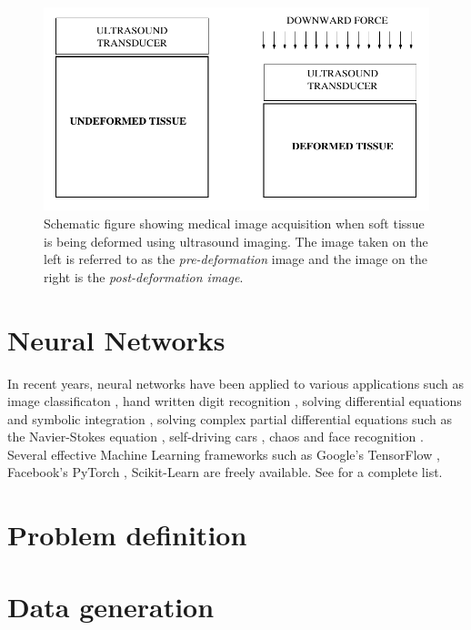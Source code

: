 \documentclass[12pt]{article}
\begin{document}
%
\begin{figure}
   \centering
    \includegraphics[totalheight=5cm]{Figures/prepostimage.png}
  \caption{\label{fig:prepostimage} Schematic figure showing medical image acquisition when soft tissue is being deformed using ultrasound imaging. The image taken on the left is referred to as the \textit{pre-deformation} image and the image on the right is the \textit{post-deformation image}.}
\end{figure}
%
\section{Neural Networks}
In recent years, neural networks have been applied to various applications such as image classificaton \cite{paper:hinton2017}, hand written digit recognition \cite{paper:kulkarni2018}, solving differential equations and symbolic integration \cite{misc:lample2019}, solving complex partial differential equations such as the Navier-Stokes equation \cite{misc:anandkumar2020}, self-driving cars \cite{misc:agnihotri2019,misc:nvidiaselfdriving2016}, chaos \cite{paper:pathak2018} and face recognition \cite{conf:taigman2014}. Several effective Machine Learning frameworks such as Google's TensorFlow \cite{misc:tensorflow}, Facebook's PyTorch \cite{incollect:pytorch}, Scikit-Learn \cite{paper:scikit-learn} are freely available. See \cite{misc:compdeep} for a complete list.

%
\section{Problem definition}
\section{Data generation}
\end{document}
